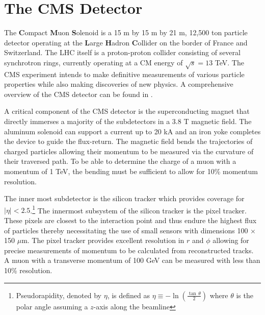 \documentclass[a4paper,12pt]{article}
\begin{document}
\section{The CMS Detector}

    The \textbf{C}ompact \textbf{M}uon \textbf{S}olenoid is a 15 m by 15 m by 21
    m, 12,500 ton particle detector operating at the \textbf{L}arge \textbf{H}adron
    \textbf{C}ollider on the border of France and Switzerland. The LHC itself is a
    proton-proton collider consisting of several synchrotron rings, currently
    operating at a CM energy of $\sqrt{s} = 13$ TeV. The CMS experiment intends to 
    make definitive measurements of various particle properties while also making
    discoveries of new physics. A comprehensive overview of the CMS detector can be
    found in \cite{CMSTDR}.

    A critical component of the CMS detector is the superconducting magnet that
    directly immerses a majority of the subdetectors in a 3.8 T magnetic field.
    The aluminum solenoid can support a current up to 20 kA and an iron yoke
    completes the device to guide the flux-return.  The magnetic field bends the
    trajectories of charged particles allowing their momentum to be measured via
    the curvature of their traversed path. To be able to determine the charge of
    a muon with a momentum of 1 TeV, the bending must be sufficient to allow for
    10\% momentum resolution. 

    The inner most subdetector is the silicon tracker which provides coverage
    for $|\eta| < 2.5$.\footnote{Pseudorapidity, denoted by $\eta$, is defined
    as $\eta \equiv -\ln \left(\frac{\tan\,\theta}{2}\right)$ where $\theta$ is
    the polar angle assuming a $z$-axis along the beamline} The innermost
    subsystem of the silicon tracker is the pixel tracker. These pixels are
    closest to the interaction point and thus endure the highest flux of
    particles thereby necessitating the use of small sensors with dimensions 100
    $\times$ 150 $\mu$m. The pixel tracker provides excellent resolution in $r$
    and $\phi$ allowing for precise measurements of momentum to be calculated
    from reconstructed tracks. A muon with a transverse momentum of 100 GeV can
    be measured with less than 10\% resolution. 
\end{document}
